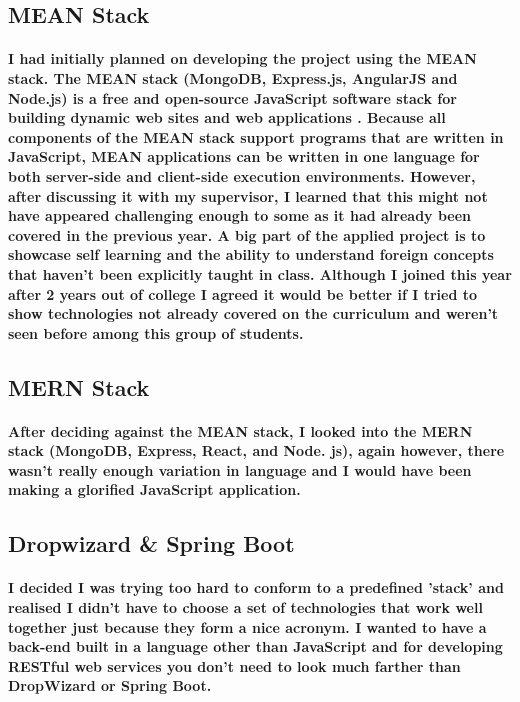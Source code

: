\subsection{MEAN Stack}
\paragraph{I had initially planned on developing the project using the MEAN stack. The MEAN stack (MongoDB, Express.js, AngularJS and Node.js) is a free and open-source JavaScript software stack for building dynamic web sites and web applications \cite{mean}. Because all components of the MEAN stack support programs that are written in JavaScript, MEAN applications can be written in one language for both server-side and client-side execution environments. However, after discussing it with my supervisor, I learned that this might not have appeared challenging enough to some as it had already been covered in the previous year. A big part of the applied project is to showcase self learning and the ability to understand foreign concepts that haven't been explicitly taught in class. Although I joined this year after 2 years out of college I agreed it would be better if I tried to show technologies not already covered on the curriculum and weren't seen before among this group of students.}

\subsection{MERN Stack}
\paragraph{After deciding against the MEAN stack, I looked into the MERN stack (MongoDB, Express, React, and Node. js), again however, there wasn't really enough variation in language and I would have been making a glorified JavaScript application.}

\subsection{Dropwizard \& Spring Boot}
\paragraph{I decided I was trying too hard to conform to a predefined 'stack' and realised I didn't have to choose a set of technologies that work well together just because they form a nice acronym. I wanted to have a back-end built in a language other than JavaScript and for developing RESTful web services you don't need to look much farther than DropWizard or Spring Boot.}


